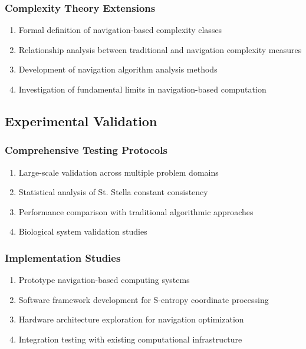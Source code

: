 \documentclass[11pt]{article}
\begin{document}
\subsubsection{Complexity Theory Extensions}

\begin{enumerate}
\item Formal definition of navigation-based complexity classes
\item Relationship analysis between traditional and navigation complexity measures
\item Development of navigation algorithm analysis methods
\item Investigation of fundamental limits in navigation-based computation
\end{enumerate}

\subsection{Experimental Validation}

\subsubsection{Comprehensive Testing Protocols}

\begin{enumerate}
\item Large-scale validation across multiple problem domains
\item Statistical analysis of St. Stella constant consistency
\item Performance comparison with traditional algorithmic approaches
\item Biological system validation studies
\end{enumerate}

\subsubsection{Implementation Studies}

\begin{enumerate}
\item Prototype navigation-based computing systems
\item Software framework development for S-entropy coordinate processing
\item Hardware architecture exploration for navigation optimization
\item Integration testing with existing computational infrastructure
\end{enumerate}
\end{document}
